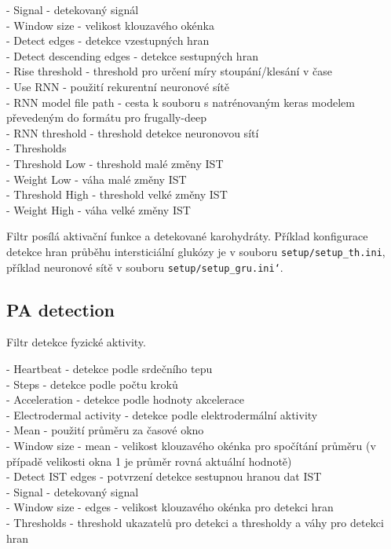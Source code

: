\noindent- Signal - detekovaný signál\\
- Window size - velikost klouzavého okénka\\
- Detect edges - detekce vzestupných hran\\
- Detect descending edges - detekce sestupných hran\\
- Rise threshold - threshold pro určení míry stoupání/klesání v čase\\
- Use RNN - použití rekurentní neuronové sítě\\
- RNN model file path - cesta k souboru s natrénovaným keras modelem převedeným do formátu pro frugally-deep\\
- RNN threshold - threshold detekce neuronovou sítí\\
- Thresholds\\
	\indent- Threshold Low - threshold malé změny IST\\
	\indent- Weight Low - váha malé změny IST\\
	\indent- Threshold High - threshold velké změny IST\\
	\indent- Weight High - váha velké změny IST

Filtr posílá aktivační funkce a detekované karohydráty.
Příklad konfigurace detekce hran průběhu intersticiální glukózy je v souboru \texttt{setup/setup\_th.ini}, příklad neuronové sítě v souboru \texttt{setup/setup\_gru.ini`}.

\subsection*{PA detection}

Filtr detekce fyzické aktivity.

\noindent- Heartbeat - detekce podle srdečního tepu\\
- Steps - detekce podle počtu kroků\\
- Acceleration - detekce podle hodnoty akcelerace\\
- Electrodermal activity - detekce podle elektrodermální aktivity\\
- Mean - použití průměru za časové okno\\
- Window size - mean - velikost klouzavého okénka pro spočítání průměru (v případě velikosti okna 1 je průměr rovná aktuální hodnotě)\\
- Detect IST edges - potvrzení detekce sestupnou hranou dat IST\\
- Signal - detekovaný signal\\
- Window size - edges - velikost klouzavého okénka pro detekci hran\\
- Thresholds - threshold ukazatelů pro detekci a thresholdy a váhy pro detekci hran

